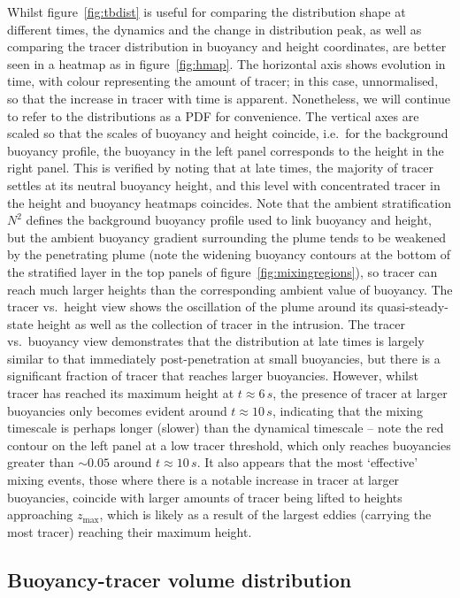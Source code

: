 \documentclass[a4paper]{article}
\begin{document}
Whilst figure~\ref{fig:tbdist} is useful for comparing the distribution shape at different times, the
dynamics and the change in distribution peak, as well as comparing the tracer distribution in buoyancy and
height coordinates, are better seen in a heatmap as in figure~\ref{fig:hmap}. The horizontal axis shows
evolution in time, with colour representing the amount of tracer; in this case, unnormalised, so that the
increase in tracer with time is apparent. Nonetheless, we will continue to refer to the distributions as a PDF
for convenience. The vertical axes are scaled so that the scales of buoyancy and height coincide,
i.e.\ for the background buoyancy profile, the buoyancy in the left panel corresponds to the height in the
right panel. This is verified by noting that at late times, the majority of tracer settles at its neutral
buoyancy height, and this level with concentrated tracer in the height and buoyancy heatmaps coincides. Note
that the ambient stratification $N^2$ defines the background buoyancy profile used to link buoyancy and
height, but the ambient buoyancy gradient surrounding the plume tends to be weakened by the penetrating plume
(note the widening buoyancy contours at the bottom of the stratified layer in the top panels of
figure~\ref{fig:mixingregions}), so tracer can reach much larger heights than the corresponding ambient value
of buoyancy. The tracer vs.\ height view shows the oscillation of the plume around its quasi-steady-state
height as well as the collection of tracer in the intrusion. The tracer vs.\ buoyancy view demonstrates that
the distribution at late times is largely similar to that immediately post-penetration at small buoyancies,
but there is a significant fraction of tracer that reaches larger buoyancies. However, whilst tracer has
reached its maximum height at $t \approx 6 \, s$, the presence of tracer at larger buoyancies only becomes
evident around $t \approx 10\,s$, indicating that the mixing timescale is perhaps longer (slower) than the
dynamical timescale -- note the red contour on the left panel at a low tracer threshold, which only reaches
buoyancies greater than $\sim 0.05$ around $t \approx 10\,s$. It also appears that the most `effective' mixing
events, those where there is a notable increase in tracer at larger buoyancies, coincide with larger amounts
of tracer being lifted to heights approaching $z_{\max}$, which is likely as a result of the largest eddies
(carrying the most tracer) reaching their maximum height.

\subsection{Buoyancy-tracer volume distribution}
\end{document}
